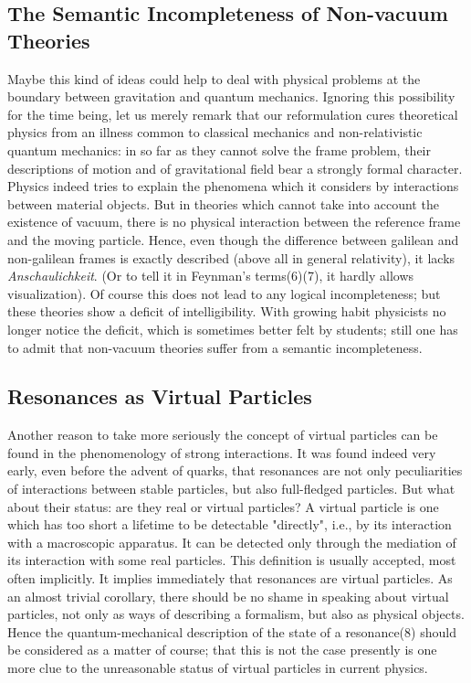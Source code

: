 \documentclass[a4paper,11pt]{article}
\begin{document}
\subsection{The Semantic Incompleteness of Non-vacuum Theories}

Maybe this kind of ideas could help to deal with physical problems at the boundary between 
gravitation and quantum mechanics. Ignoring this possibility for the time being, let us merely 
remark that our reformulation cures theoretical physics from an illness common to classical 
mechanics and non-relativistic quantum mechanics: in so far as they cannot solve the frame 
problem, their descriptions of motion and of gravitational field bear a strongly formal 
character. Physics indeed tries to explain the phenomena which it considers by interactions 
between material objects. But in theories which cannot take into account the existence of 
vacuum, there is no physical interaction between the reference frame and the moving particle. 
Hence, even though the difference between galilean and non-galilean frames is exactly described 
(above all in general relativity), it lacks {\it Anschaulichkeit}. (Or to tell it in Feynman's 
terms(6)(7), it hardly allows visualization). Of course this does not lead to any logical 
incompleteness; but these theories show a deficit of intelligibility. With growing habit 
physicists no longer notice the deficit, which is sometimes better felt by students; still one 
has to admit that non-vacuum theories suffer from a semantic incompleteness.

\subsection{Resonances as Virtual Particles}
 \label{sec.2.3}

Another reason to take more seriously the concept of virtual particles can be found in the 
phenomenology of strong interactions. It was found indeed very early, even before the advent of 
quarks, that resonances are not only peculiarities of interactions between stable particles, 
but also full-fledged particles. But what about their status: are they real or virtual 
particles? A virtual particle is one which has too short a lifetime to be detectable 
"directly", i.e., by its interaction with a macroscopic apparatus. It can be detected only 
through the mediation of its interaction with some real particles. This definition is usually 
accepted, most often implicitly. It implies immediately that resonances are virtual particles. 
As an almost trivial corollary, there should be no shame in speaking about virtual particles, 
not only as ways of describing a formalism, but also as physical objects. Hence the 
quantum-mechanical description of the state of a resonance(8) should be considered as a matter 
of course; that this is not the case presently is one more clue to the unreasonable status of 
virtual particles in current physics.
\end{document}
